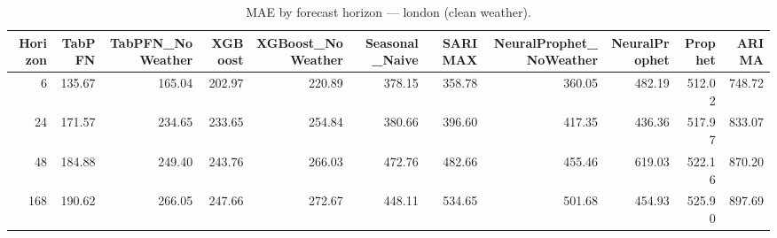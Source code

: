 \begin{table}[ht!]
\centering
\caption{MAE by forecast horizon — london (clean weather).}
\label{tab:mae_by_horizon_london}
\begin{tabular}{rrrrrrrrrrr}
\toprule
Horizon & TabPFN & TabPFN\_NoWeather & XGBoost & XGBoost\_NoWeather & Seasonal\_Naive & SARIMAX & NeuralProphet\_NoWeather & NeuralProphet & Prophet & ARIMA \\
\midrule
6 & 135.67 & 165.04 & 202.97 & 220.89 & 378.15 & 358.78 & 360.05 & 482.19 & 512.02 & 748.72 \\
24 & 171.57 & 234.65 & 233.65 & 254.84 & 380.66 & 396.60 & 417.35 & 436.36 & 517.97 & 833.07 \\
48 & 184.88 & 249.40 & 243.76 & 266.03 & 472.76 & 482.66 & 455.46 & 619.03 & 522.16 & 870.20 \\
168 & 190.62 & 266.05 & 247.66 & 272.67 & 448.11 & 534.65 & 501.68 & 454.93 & 525.90 & 897.69 \\
\bottomrule
\end{tabular}
\end{table}
